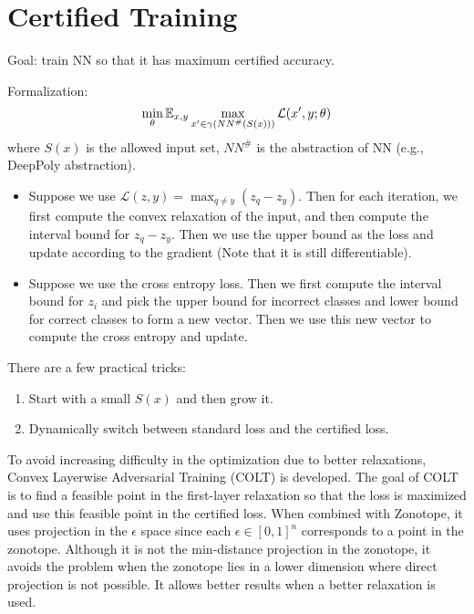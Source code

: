 \section{Certified Training}

Goal: train NN so that it has maximum certified accuracy.

Formalization: 
$$\min_\theta \mathbb{E}_{x,y} \max_{x^\prime\in \gamma(NN^{\#}(S(x)))} \mathcal{L}(x^\prime, y;\theta)$$
where $S(x)$ is the allowed input set, $NN^{\#}$ is the abstraction of NN (e.g., DeepPoly abstraction). 
\begin{itemize}
    \item Suppose we use $\mathcal{L}(z, y) = \max_{q\ne y}(z_q-z_y)$. Then for each iteration, we first compute the convex relaxation of the input, and then compute the interval bound for $z_q-z_y$. Then we use the upper bound as the loss and update according to the gradient (Note that it is still differentiable).
    \item Suppose we use the cross entropy loss. Then we first compute the interval bound for $z_i$ and pick the upper bound for incorrect classes and lower bound for correct classes to form a new vector. Then we use this new vector to compute the cross entropy and update.
\end{itemize}
There are a few practical tricks:
\begin{enumerate}
    \item Start with a small $S(x)$ and then grow it.
    \item Dynamically switch between standard loss and the certified loss.
\end{enumerate}

To avoid increasing difficulty in the optimization due to better relaxations, Convex Layerwise Adversarial Training (COLT) is developed. The goal of COLT is to find a feasible point in the first-layer relaxation so that the loss is maximized and use this feasible point in the certified loss. When combined with Zonotope, it uses projection in the $\epsilon$ space since each $\epsilon \in [0,1]^n$ corresponds to a point in the zonotope. Although it is not the min-distance projection in the zonotope, it avoids the problem when the zonotope lies in a lower dimension where direct projection is not possible. It allows better results when a better relaxation is used.